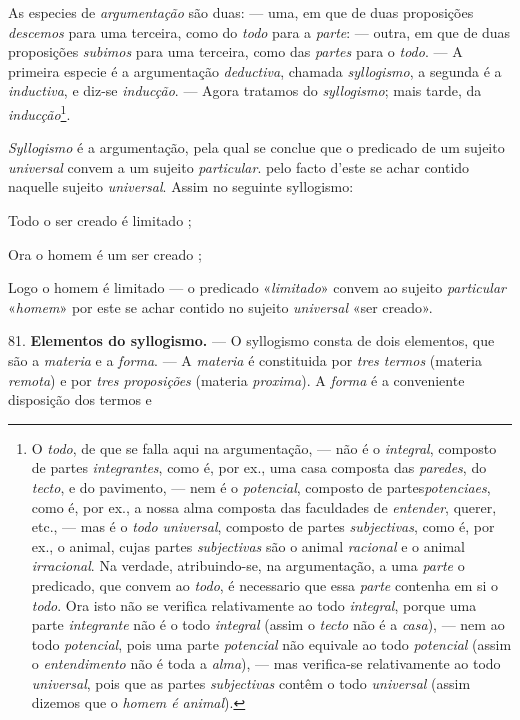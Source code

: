 
As especies de \emph{argumentação} são duas: --- uma, em que de duas proposições \emph{descemos} para uma terceira, como do \emph{todo} para a \emph{parte}: --- outra, em que de duas proposições \emph{subimos} para uma terceira, como das \emph{partes} para o \emph{todo}. --- A primeira especie é a argumentação \emph{deductiva}, chamada \emph{syllogismo}, a segunda é a \emph{inductiva}, e diz-se \emph{inducção}. --- Agora tratamos do \emph{syllogismo}; mais tarde, da \emph{inducção}\footnote{O \emph{todo}, de que se falla aqui na argumentação, --- não é o \emph{integral}, composto de partes \emph{integrantes}, como é, por ex., uma casa composta das \emph{paredes}, do \emph{tecto}, e do pavimento, --- nem é o \emph{potencial}, composto de partes\emph{potenciaes}, como é, por ex., a nossa alma composta das faculdades de \emph{entender}, querer, etc., --- mas é o \emph{todo universal}, composto de partes \emph{subjectivas}, como é, por ex., o animal, cujas partes \emph{subjectivas} são o animal \emph{racional} e o animal \emph{irracional}. Na verdade, atribuindo-se, na argumentação, a uma \emph{parte} o predicado, que convem ao \emph{todo}, é necessario que essa \emph{parte} contenha em si o \emph{todo}. Ora isto não se verifica relativamente ao todo \emph{integral}, porque uma parte \emph{integrante} não é o todo \emph{integral} (assim o \emph{tecto} não é a \emph{casa}), --- nem ao todo \emph{potencial}, pois uma parte \emph{potencial} não equivale ao todo \emph{potencial} (assim o \emph{entendimento} não é toda a \emph{alma}), --- mas verifica-se relativamente ao todo \emph{universal}, pois que as partes \emph{subjectivas} contêm o todo \emph{universal} (assim dizemos que o \emph{homem é animal}).}.


 
\emph{Syllogismo} é a argumentação, pela qual se conclue que o predicado de um sujeito \emph{universal} convem a um sujeito \emph{particular}. pelo facto d'este se achar contido naquelle sujeito \emph{universal}. Assim no seguinte syllogismo:

Todo o ser creado é limitado ;

Ora o homem é um ser creado ;

Logo o homem é limitado --- o predicado «\emph{limitado}» convem ao sujeito \emph{particular} «\emph{homem}» por este se achar contido no sujeito \emph{universal} «ser creado».

81. \textbf{Elementos do syllogismo.} --- O syllogismo consta de dois elementos, que são a \emph{materia} e a \emph{forma}. --- A \emph{materia} é constituida por \emph{tres termos} (materia \emph{remota}) e por \emph{tres proposições} (materia \emph{proxima}). A \emph{forma} é a conveniente disposição dos termos e

